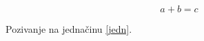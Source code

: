 \documentclass[11pt]{article}
\begin{document}
	\begin{equation} \label{jedn}
		a + b = c
	\end{equation}

	Pozivanje na jedna\v cinu \eqref{jedn}.
\end{document}
